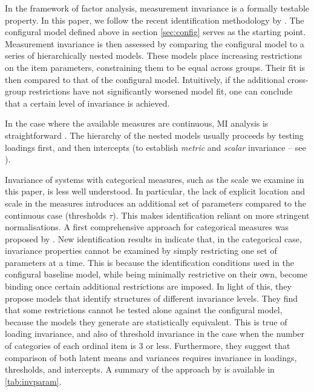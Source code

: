 In the framework of factor analysis, measurement invariance is a formally testable property. In this paper, we follow the recent identification methodology by \citet{Wu2016a}. The configural model defined above in section \ref{sec:config} serves as the starting point. Measurement invariance is then assessed by comparing the configural model to a series of hierarchically nested models. These models place increasing restrictions on the item parameters, constraining them to be equal across groups. Their fit is then compared to that of the configural model. Intuitively, if the additional cross-group restrictions have not significantly worsened model fit, one can conclude that a certain level of invariance is achieved. 

In the case where the available measures are continuous, MI analysis is straightforward \citep{vandeSchoot2012}. The hierarchy of the nested models usually proceeds by testing loadings first, and then intercepts (to establish \emph{metric} and \emph{scalar} invariance -- see \citealp{Vandenberg2000a}).

Invariance of systems with categorical measures, such as the scale we examine in this paper, is less well understood. In particular, the lack of explicit location and scale in the measures introduces an additional set of parameters compared to the continuous case (thresholds $\tau$). This makes identification reliant on more stringent normalisations. A first comprehensive approach for categorical measures was proposed by \cite{Millsap2004}. New identification results in \cite{Wu2016a} indicate that, in the categorical case, invariance properties cannot be examined by simply restricting one set of parameters at a time. This is because the identification conditions used in the configural baseline model, while being minimally restrictive on their own, become binding once certain additional restrictions are imposed. In light of this, they propose models that identify structures of different invariance levels. They find that some restrictions cannot be tested alone against the configural model, because the models they generate are statistically equivalent. This is true of loading invariance, and also of threshold invariance in the case when the number of categories of each ordinal item is 3 or less. Furthermore, they suggest that comparison of both latent means and variances requires invariance in loadings, thresholds, and intercepts. A summary of the approach by \cite{Wu2016a} is available in \autoref{tab:invparam}.

